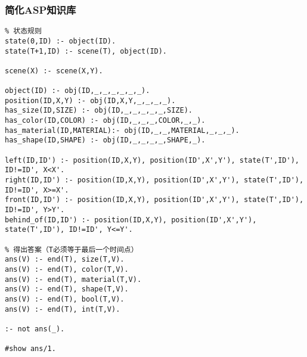\subsubsection{简化ASP知识库}
\begin{lstlisting}
% 状态规则
state(0,ID) :- object(ID).
state(T+1,ID) :- scene(T), object(ID).

scene(X) :- scene(X,Y).

object(ID) :- obj(ID,_,_,_,_,_,_).
position(ID,X,Y) :- obj(ID,X,Y,_,_,_,_).
has_size(ID,SIZE) :- obj(ID,_,_,_,_,_,SIZE).
has_color(ID,COLOR) :- obj(ID,_,_,_,COLOR,_,_).
has_material(ID,MATERIAL):- obj(ID,_,_,MATERIAL,_,_,_).
has_shape(ID,SHAPE) :- obj(ID,_,_,_,_,SHAPE,_).

left(ID,ID') :- position(ID,X,Y), position(ID',X',Y'), state(T',ID'), ID!=ID', X<X'.
right(ID,ID') :- position(ID,X,Y), position(ID',X',Y'), state(T',ID'), ID!=ID', X>=X'.
front(ID,ID') :- position(ID,X,Y), position(ID',X',Y'), state(T',ID'), ID!=ID', Y>Y'.
behind_of(ID,ID') :- position(ID,X,Y), position(ID',X',Y'), state(T',ID'), ID!=ID', Y<=Y'.

% 得出答案（T必须等于最后一个时间点）
ans(V) :- end(T), size(T,V).
ans(V) :- end(T), color(T,V).
ans(V) :- end(T), material(T,V).
ans(V) :- end(T), shape(T,V).
ans(V) :- end(T), bool(T,V).
ans(V) :- end(T), int(T,V).

:- not ans(_).

#show ans/1.
\end{lstlisting}
